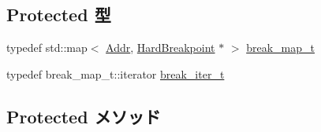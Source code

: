 \subsection*{Protected 型}
\begin{DoxyCompactItemize}
\item 
typedef std::map$<$ \hyperlink{base_2types_8hh_af1bb03d6a4ee096394a6749f0a169232}{Addr}, \hyperlink{classBaseRemoteGDB_1_1HardBreakpoint}{HardBreakpoint} $\ast$ $>$ \hyperlink{classBaseRemoteGDB_a1d52d0c05b8ee640ddcd82fe5ec33593}{break\_\-map\_\-t}
\item 
typedef break\_\-map\_\-t::iterator \hyperlink{classBaseRemoteGDB_aa4f6467b8be2918c47e0db3c90948fa2}{break\_\-iter\_\-t}
\end{DoxyCompactItemize}
\subsection*{Protected メソッド}
